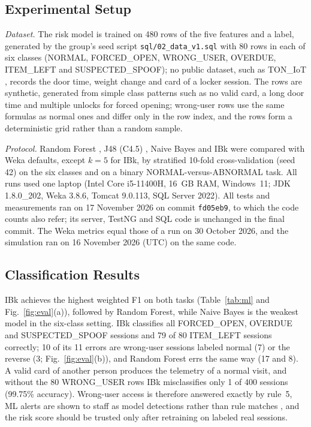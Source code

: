 \documentclass[sigconf,screen]{acmart}
\newcommand{\revisioncommit}{fd05eb9}
\begin{document}
\subsection{Experimental Setup}

\textit{Dataset.} The risk model is trained on 480 rows of the five features and a label, generated by the group's seed
script \texttt{sql/02\_data\_v1.sql} with 80 rows in each of six classes (NORMAL, FORCED\_OPEN, WRONG\_USER, OVERDUE,
ITEM\_LEFT and SUSPECTED\_SPOOF); no public dataset, such as TON\_IoT \cite{moustafa2021toniot}, records the door time,
weight change and card of a locker session. The rows are synthetic, generated from simple class patterns such as no
valid card, a long door time and multiple unlocks for forced opening; wrong-user rows use the same formulas as normal
ones and differ only in the row index, and the rows form a deterministic grid rather than a random sample.

\textit{Protocol.} Random Forest \cite{breiman2001rf}, J48 (C4.5) \cite{quinlan1993c45}, Naive Bayes \cite{john1995nb}
and IBk \cite{aha1991ibl} were compared with Weka defaults, except $k=5$ for IBk, by stratified 10-fold cross-validation
\cite{kohavi1995cv} (seed 42) on the six classes and on a binary NORMAL-versus-ABNORMAL task. All runs used one laptop
(Intel Core i5-11400H, 16~GB RAM, Windows~11; JDK 1.8.0\_202, Weka 3.8.6, Tomcat 9.0.113, SQL Server 2022). All tests and
measurements ran on 17 November 2026 on commit \texttt{\revisioncommit}, to which the code counts also refer; its server,
TestNG and SQL code is unchanged in the final commit. The Weka metrics equal those of a run on 30 October 2026, and the
simulation ran on 16 November 2026 (UTC) on the same code.

\subsection{Classification Results}

IBk achieves the highest weighted F1 on both tasks (Table~\ref{tab:ml} and Fig.~\ref{fig:eval}(a)),
followed by Random Forest, while Naive Bayes is the weakest model in the six-class setting. IBk classifies all
FORCED\_OPEN, OVERDUE and SUSPECTED\_SPOOF sessions and 79 of 80 ITEM\_LEFT sessions correctly; 10 of its 11 errors are
wrong-user sessions labeled normal (7) or the reverse (3; Fig.~\ref{fig:eval}(b)), and Random Forest errs the same way
(17 and 8). A valid card of another person produces the telemetry of a normal visit, and without the 80 WRONG\_USER rows IBk
misclassifies only 1 of 400 sessions (99.75\% accuracy). Wrong-user access is therefore answered exactly by rule~5,
ML alerts are shown to staff as model detections rather than rule matches \cite{sommer2010outside}, and the risk
score should be trusted only after retraining on labeled real sessions.
\end{document}
